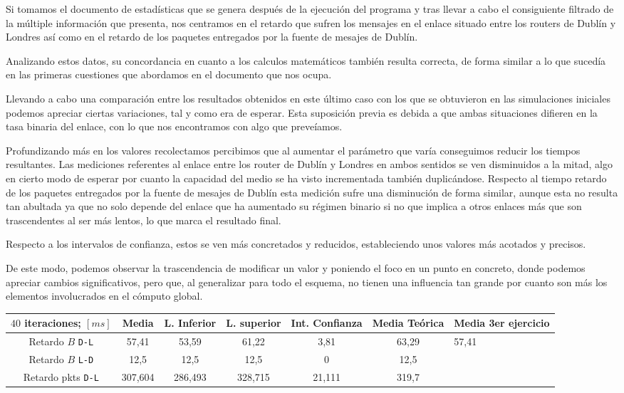 Si tomamos el documento de estadísticas que se genera después de la ejecución del programa y tras llevar a cabo el consiguiente filtrado de la múltiple información que presenta, nos centramos en el retardo que sufren los mensajes en el enlace situado entre los routers de Dublín y Londres así como en el retardo de los paquetes entregados por la fuente de mesajes de Dublín.

Analizando estos datos, su concordancia en cuanto a los calculos matemáticos también resulta correcta, de forma similar a lo que sucedía en las primeras cuestiones que abordamos en el documento que nos ocupa.

Llevando a cabo una comparación entre los resultados obtenidos en este último caso con los que se obtuvieron en las simulaciones iniciales podemos apreciar ciertas variaciones, tal y como era de esperar. Esta suposición previa es debida a que ambas situaciones difieren en la tasa binaria del enlace, con lo que nos encontramos con algo que preveíamos.

Profundizando más en los valores recolectamos percibimos que al aumentar el parámetro que varía conseguimos reducir los tiempos resultantes. Las mediciones referentes al enlace entre los router de Dublín y Londres en ambos sentidos se ven disminuidos a la mitad, algo en cierto modo de esperar por cuanto la capacidad del medio se ha visto incrementada también duplicándose. Respecto al tiempo retardo de los paquetes entregados por la fuente de mesajes de Dublín esta medición sufre una disminución de forma similar, aunque esta no resulta tan abultada ya que no solo depende del enlace que ha aumentado su régimen binario si no que implica a otros enlaces más que son trascendentes al ser más lentos, lo que marca el resultado final.

Respecto a los intervalos de confianza, estos se ven más concretados y reducidos, estableciendo unos valores más acotados y precisos.

De este modo, podemos observar la trascendencia de modificar un valor y poniendo el foco en un punto en concreto, donde podemos apreciar cambios significativos, pero que, al generalizar para todo el esquema, no tienen una influencia tan grande por cuanto son más los elementos involucrados en el cómputo global.

\begin{tabular}{| c | c | c | c | c | c |}
			\hline
			$40$ iteraciones; $[ms]$ & Media & L. Inferior & L. superior & Int. Confianza & Media Teórica & Media 3er ejercicio\\
			\hline
			Retardo $B$ \texttt{D-L} & 57,41 & 53,59 & 61,22 & 3,81 & 63,29 & 57,41\\
			\hline
			Retardo $B$ \texttt{L-D} & 12,5 & 12,5 & 12,5 & 0 & 12,5\\
			\hline
			Retardo pkts \texttt{D-L} & 307,604 & 286,493 & 328,715 & 21,111 & 319,7\\
			\hline
		\end{tabular}